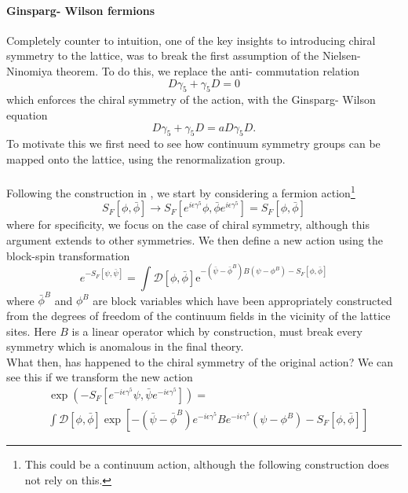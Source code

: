 \documentclass[a4paper,10pt]{article}
\begin{document}
\paragraph{Ginsparg- Wilson fermions}
Completely counter to intuition, one of the key insights to introducing chiral symmetry to the lattice, was to break the first assumption of the Nielsen-Ninomiya theorem. To do this, we replace the anti- commutation relation
\begin{equation}
D \gamma_{5}+\gamma_{5} D=0
\end{equation}
which enforces the chiral symmetry of the action, with the Ginsparg- Wilson equation
\begin{equation}
D \gamma_{5}+\gamma_{5} D=a D \gamma_{5} D.
\end{equation}
To motivate this we first need to see how continuum symmetry groups can be mapped onto the lattice, using the renormalization group.\\\\Following the construction in \cite{GinspargPaulH1982Aroc}, we start by considering a fermion action\footnote{This could be a continuum action, although the following construction does not rely on this.}
\begin{equation}
S_{F}[\phi, \bar{\phi}] \rightarrow S_{F}\left[e^{i \epsilon \gamma^{5}} \phi, \bar{\phi} e^{i \epsilon \gamma^{5}}\right]=S_{F}\left[ \phi, \bar{\phi} \right]
\end{equation}
where for specificity, we focus on the case of chiral symmetry, although this argument extends to other symmetries. We then define a new action using the block-spin transformation
\begin{equation}
e^{-S_F[\psi,\bar{\psi}]}=\int \mathcal{D}[\phi, \bar{\phi}] \mathrm{e}^{-\left(\bar{\psi}-\bar{\phi}^{B}\right) B\left(\psi-\phi^{B}\right)-S_{F}[\phi, \bar{\phi}]}
\end{equation}
where $\bar{\phi}^{B}$ and $\phi^{B}$ are block variables which have been appropriately constructed from the degrees of freedom of the continuum fields in the vicinity of the lattice sites. Here $B$ is a linear operator which by construction, must break every symmetry which is anomalous in the final theory.\\What then, has happened to the chiral symmetry of the original action? We can see this if we transform the new action
\begin{equation}
\begin{aligned} 
&\exp \left(-S_F\left[e^{-i \epsilon \gamma^{5}} \psi, \bar{\psi} e^{-i \epsilon \gamma^{5}}\right]\right)=\\&\int \mathcal{D}[\phi, \bar{\phi}] \exp \left[-(\bar{\psi}-\bar{\phi}^B) e^{-i \epsilon \gamma^{5}} B e^{-i \epsilon \gamma^{5}}(\psi-\phi^B)-S_F[\phi, \bar{\phi}]\right]
\end{aligned}
\end{equation}
\end{document}
